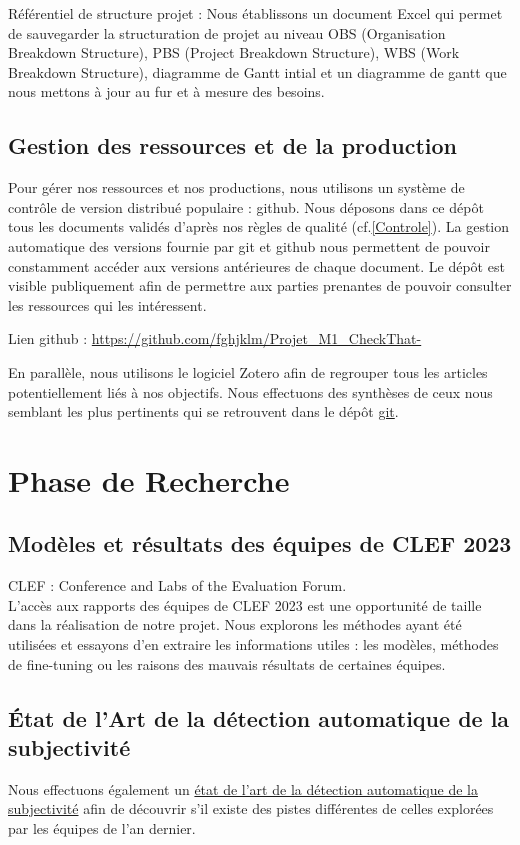 \documentclass[11pt]{rapport_class}
\begin{document}
Référentiel de structure projet : Nous établissons un document Excel qui permet de sauvegarder la structuration de projet au niveau OBS (Organisation Breakdown Structure), PBS (Project Breakdown Structure), WBS (Work Breakdown Structure), diagramme de Gantt intial et un diagramme de gantt que nous mettons à jour au fur et à mesure des besoins.

\section{Gestion des ressources et de la production}
\qquad Pour gérer nos ressources et nos productions, nous utilisons un système de contrôle de version distribué populaire : github. Nous déposons dans ce dépôt tous les documents validés d'après nos règles de qualité (cf.\ref{Controle}). La gestion automatique des versions fournie par git et github nous permettent de pouvoir constamment accéder aux versions antérieures de chaque document. Le dépôt est visible publiquement afin de permettre aux parties prenantes de pouvoir consulter les ressources qui les intéressent.

Lien github : \url{https://github.com/fghjklm/Projet_M1_CheckThat-}

En parallèle, nous utilisons le logiciel Zotero afin de regrouper tous les articles potentiellement liés à nos objectifs. Nous effectuons des synthèses de ceux nous semblant les plus pertinents qui se retrouvent dans le dépôt \href{https://github.com/fghjklm/Projet_M1_CheckThat-/tree/main/articles}{git}.


\chapter{Phase de Recherche}
\section{Modèles et résultats des équipes de CLEF 2023}
CLEF : Conference and Labs of the Evaluation Forum.\\
\vspace{0mm}
\qquad L'accès aux rapports des équipes de CLEF 2023 est une opportunité de taille dans la réalisation de notre projet. Nous explorons les méthodes ayant été utilisées et essayons d'en extraire les informations utiles : les modèles, méthodes de fine-tuning ou les raisons des mauvais résultats de certaines équipes.

\section{État de l'Art de la détection automatique de la subjectivité}
\qquad Nous effectuons également un \href{https://github.com/fghjklm/Projet_M1_CheckThat-/tree/main/articles}{état de l'art de la détection automatique de la subjectivité} afin de découvrir s'il existe des pistes différentes de celles explorées par les équipes de l'an dernier.
\end{document}
